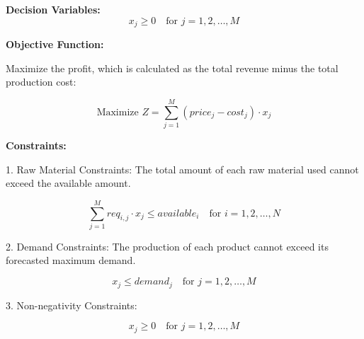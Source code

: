 \documentclass{article}
\begin{document}
\textbf{Decision Variables:}
\[
x_j \geq 0 \quad \text{for } j = 1, 2, \ldots, M
\]

\textbf{Objective Function:}

Maximize the profit, which is calculated as the total revenue minus the total production cost:

\[
\text{Maximize } Z = \sum_{j=1}^{M} (price_j - cost_j) \cdot x_j
\]

\textbf{Constraints:}

1. Raw Material Constraints: The total amount of each raw material used cannot exceed the available amount.

\[
\sum_{j=1}^{M} req_{i,j} \cdot x_j \leq available_i \quad \text{for } i = 1, 2, \ldots, N
\]

2. Demand Constraints: The production of each product cannot exceed its forecasted maximum demand.

\[
x_j \leq demand_j \quad \text{for } j = 1, 2, \ldots, M
\]

3. Non-negativity Constraints:

\[
x_j \geq 0 \quad \text{for } j = 1, 2, \ldots, M
\]
\end{document}

